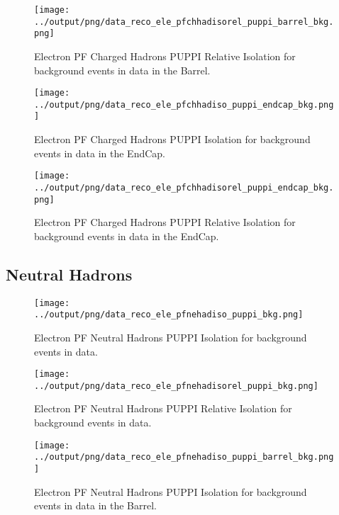 \documentclass[11pt]{book}
\begin{document}
\begin{figure}[htb]
\centering
\texttt{[image: ../output/png/data\_reco\_ele\_pfchhadisorel\_puppi\_barrel\_bkg.png]}
\caption{Electron PF Charged Hadrons PUPPI Relative Isolation for background events in data in the Barrel.}
\label{fig:data_ele_pfchhadisorel_puppi_barrel_bkg}
\end{figure}

\begin{figure}[htb]
\centering
\texttt{[image: ../output/png/data\_reco\_ele\_pfchhadiso\_puppi\_endcap\_bkg.png]}
\caption{Electron PF Charged Hadrons PUPPI Isolation for background events in data in the EndCap.}
\label{fig:data_ele_pfchhadiso_puppi_endcap_bkg}
\end{figure}

\begin{figure}[htb]
\centering
\texttt{[image: ../output/png/data\_reco\_ele\_pfchhadisorel\_puppi\_endcap\_bkg.png]}
\caption{Electron PF Charged Hadrons PUPPI Relative Isolation for background events in data in the EndCap.}
\label{fig:data_ele_pfchhadisorel_puppi_endcap_bkg}
\end{figure}
\clearpage

\subsection{Neutral Hadrons}
\begin{figure}[htb]
\centering
\texttt{[image: ../output/png/data\_reco\_ele\_pfnehadiso\_puppi\_bkg.png]}
\caption{Electron PF Neutral Hadrons PUPPI Isolation for background events in data.}
\label{fig:data_ele_pfnehadiso_puppi_bkg}
\end{figure}

\begin{figure}[htb]
\centering
\texttt{[image: ../output/png/data\_reco\_ele\_pfnehadisorel\_puppi\_bkg.png]}
\caption{Electron PF Neutral Hadrons PUPPI Relative Isolation for background events in data.}
\label{fig:data_ele_pfnehadisorel_puppi_bkg}
\end{figure}

\begin{figure}[htb]
\centering
\texttt{[image: ../output/png/data\_reco\_ele\_pfnehadiso\_puppi\_barrel\_bkg.png]}
\caption{Electron PF Neutral Hadrons PUPPI Isolation for background events in data in the Barrel.}
\label{fig:data_ele_pfnehadiso_puppi_barrel_bkg}
\end{figure}
\end{document}
